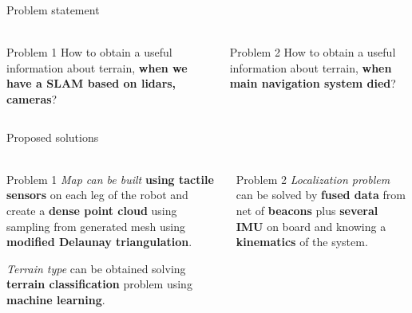 \documentclass[aspectratio=169]{beamer}
\begin{document}
\begin{frame}[t]{Problem statement}
    \framesubtitle{}
    \begin{columns}[T,onlytextwidth]
        \begin{column}{0.45\textwidth}
            \begin{block}{Problem 1}
                How to obtain a useful information about terrain, \textbf{when we have a SLAM based on lidars, cameras}?
                \vspace{5pt}

            \end{block}
        \end{column}
        \begin{column}{0.45\textwidth}
            \begin{block}{Problem 2}
                How to obtain a useful information about terrain,\textbf{ when main navigation system died}?
                \vspace{5pt}

            \end{block}
        \end{column}
    \end{columns}
\end{frame}

\begin{frame}[t]{Proposed solutions}
    \framesubtitle{}
    \begin{columns}[T,onlytextwidth]
        \begin{column}{0.45\textwidth}
            \begin{block}{Problem 1}
                \textit{Map can be built} \textbf{using tactile sensors} on each leg of the robot and create a \textbf{dense point cloud} using sampling from generated mesh using \textbf{modified Delaunay triangulation}.
                \vspace{5pt}

                \textit{Terrain type} can be obtained solving \textbf{terrain classification} problem using \textbf{machine learning}.
            \end{block}
        \end{column}
        \begin{column}{0.45\textwidth}
            \begin{block}{Problem 2}
                \textit{Localization problem} can be solved by \textbf{fused data} from net of \textbf{beacons} plus \textbf{several IMU} on board and knowing a \textbf{kinematics} of the system.
            \end{block}
        \end{column}
    \end{columns}
\end{frame}
\end{document}
